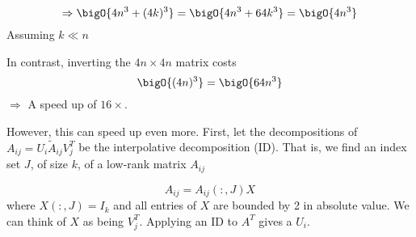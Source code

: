 \begin{equation*}
    \Rightarrow \bigO{4n^3 + (4k)^3} = \bigO{4n^3 + 64k^3} = \bigO{4n^3}
\end{equation*}
Assuming $k\ll n$

In contrast, inverting the $4n\times 4n$ matrix costs
\begin{equation*}
    \bigO{(4n)^3} = \bigO{64n^3}
\end{equation*}
$\Rightarrow$ A speed up of $16\times$.

However, this can speed up even more. First, let the decompositions of
$A_{ij} = U_i \widetilde{A}_{ij}V^T_j$ be the interpolative decomposition (ID). That is, we find an index set $J$, of size $k$, of a low-rank matrix $A_{ij}$

\begin{equation*}
    A_{ij} = A_{ij}(:, J) X
\end{equation*}
where $X(:, J)=I_k$ and all entries of $X$ are bounded by 2 in absolute value. We can think of $X$ as being $V^T_j$. Applying an ID to $A^T$ gives a $U_i$.

